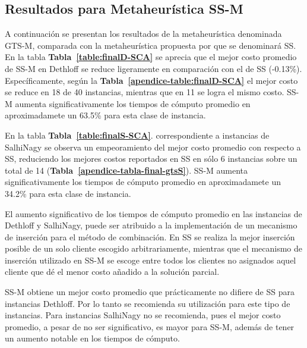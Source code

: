 \subsection{Resultados para Metaheurística SS-M}


A continuación se presentan los resultados de la metaheurística denominada GTS-M, comparada con la metaheurística propuesta por \cite{SCAimp} que se denominará SS.\\

En la tabla  \textbf{Tabla~\ref{table:finalD-SCA}} se aprecia que el mejor costo promedio de SS-M en Dethloff se reduce ligeramente en comparación con el de SS (-0.13\%). Específicamente, según la \textbf{Tabla~\ref{apendice-table:finalD-SCA}} el mejor costo se reduce en 18 de 40 instancias, mientras que en 11 se logra el mismo costo. SS-M aumenta significativamente los tiempos de cómputo promedio en aproximadamete un 63.5\% para esta clase de instancia.

En la tabla  \textbf{Tabla~\ref{table:finalS-SCA}}. correspondiente a instancias de SalhiNagy se observa un empeoramiento del mejor costo promedio con respecto a SS, reduciendo los mejores costos reportados en SS en sólo 6 instancias sobre un total de 14 (\textbf{Tabla~\ref{apendice-tabla-final-gtsS}}). SS-M aumenta significativamente los tiempos de cómputo promedio en aproximadamete un 34.2\% para esta clase de instancia.

El aumento significativo de los tiempos de cómputo promedio en las instancias de Dethloff y SalhiNagy, puede ser atribuido a la implementación de un mecanismo de inserción para el método de combinación. En SS se realiza la mejor inserción posible de un solo cliente escogido arbitrariamente, mientras que el mecanismo de inserción utilizado en SS-M se escoge entre todos los clientes no asignados aquel cliente que dé el menor costo añadido a la solución parcial.


SS-M obtiene un mejor costo promedio que prácticamente no difiere de SS para instancias Dethloff. Por lo tanto se recomienda su utilización para este tipo de instancias. Para instancias SalhiNagy no se recomienda, pues el mejor costo promedio, a pesar de no ser significativo, es mayor para SS-M, adem\'{a}s de tener un aumento notable en los tiempos de cómputo.


%
		 
